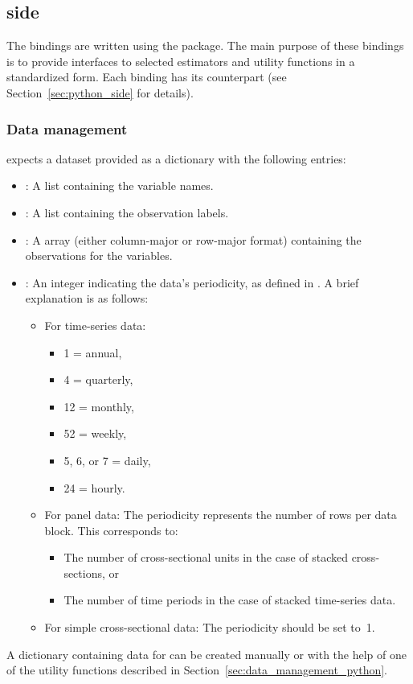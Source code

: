\subsection[\texttt{C++} side]{ side}\label{sec:binary_bindings}
The \cpp bindings are written using the 
\citep{pybind11} package.
The main purpose of these bindings is to provide \python
interfaces to selected \lgretl estimators and utility functions
in a standardized form. Each \cpp binding has its \python
counterpart (see Section~\ref{sec:python_side} for details).


\subsubsection{Data management}\label{sec:data_management_c++}
\gretlpy expects a dataset provided as a dictionary with
the following entries:
\begin{itemize}
	\item {}: A list containing the variable names.
	\item {}: A list containing the observation labels.
	\item {}: A  array (either column-major
		or row-major format) containing the observations for the variables.
	\item {}: An integer indicating the data's periodicity,
		as defined in \cite{gretl_command}. A brief explanation is as follows:
		\begin{itemize}
			\item For time-series data:
				\begin{itemize}
					\item 1 = annual,
					\item 4 = quarterly,
					\item 12 = monthly,
					\item 52 = weekly,
					\item 5, 6, or 7 = daily,
					\item 24 = hourly.
				\end{itemize}
			\item For panel data: The periodicity represents the number
				of rows per data block. This corresponds to:
				\begin{itemize}
					\item The number of cross-sectional units in the case
						of stacked cross-sections, or
					\item The number of time periods in the case of
						stacked time-series data.
				\end{itemize}
			\item For simple cross-sectional data: The periodicity should
				be set to~1.
		\end{itemize}
\end{itemize}
A dictionary containing data for \gretlpy can be created
manually or with the help of one of the utility functions
described in Section~\ref{sec:data_management_python}.

